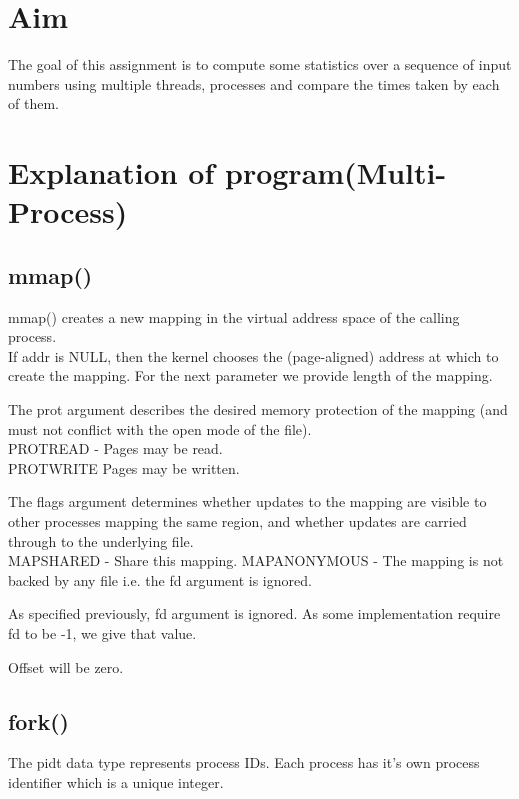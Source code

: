 \documentclass[12pt]{article}
\begin{document}
\maketitle

\section{Aim}
The goal of this assignment is to compute some statistics over a sequence of input numbers
using multiple threads, processes and compare the times taken by each of them.

\section{Explanation of program(Multi-Process)}

\subsection{mmap()}
mmap() creates a new mapping in the virtual address space of the calling process. \\

If addr is NULL, then the kernel chooses the (page-aligned) address at which to create the mapping. For the next parameter we provide length of the mapping.

The prot argument describes the desired memory protection of the mapping (and must not conflict with the open mode of the file).\\
PROT\textunderscore READ -  Pages may be read.\\
PROT\textunderscore WRITE Pages may be written.

The flags argument determines whether updates to the mapping are visible to other processes mapping the same region, and whether updates are carried through to the underlying file.\\
MAP\textunderscore SHARED - Share this mapping.
MAP\textunderscore ANONYMOUS - The mapping is not backed by any file i.e. the fd argument is ignored.

As specified previously, fd argument is ignored. As some implementation require fd to be -1, we give that value.

Offset will be zero.

\subsection{fork()}

The pid\textunderscore t  data type represents process IDs. Each process has it's own process identifier which is a unique integer. \\
\end{document}
